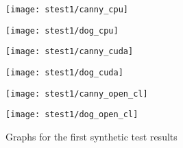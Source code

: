 \begin{table}[H]
\centering
{}
\caption{Test plans for the  Synthetic tester for \ac{DoG} algorithm}
\label{tab:sync_pic_dog}
\end{table}


\begin{figure}[H]
\centering
\begin{minipage}[t]{.49\textwidth}
\centering
\texttt{[image: stest1/canny\_cpu]}
\end{minipage}
\begin{minipage}[t]{.49\textwidth}
\centering
\texttt{[image: stest1/dog\_cpu]}
\end{minipage}
\begin{minipage}[t]{.49\textwidth}
\centering
\texttt{[image: stest1/canny\_cuda]}
\end{minipage}
\begin{minipage}[t]{.49\textwidth}
\centering
\texttt{[image: stest1/dog\_cuda]}
\end{minipage}
\begin{minipage}[t]{.49\textwidth}
\centering
\texttt{[image: stest1/canny\_open\_cl]}
\end{minipage}
\begin{minipage}[t]{.49\textwidth}
\centering
\texttt{[image: stest1/dog\_open\_cl]}
\end{minipage}
\caption{Graphs for the first synthetic test results}
\label{fig:test1s}
\end{figure}

